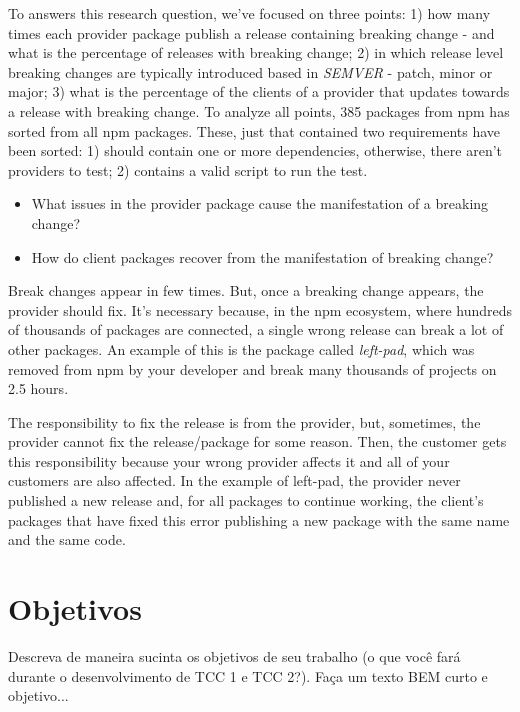 To answers this research question, we’ve focused on three points: 1) how many times each provider package publish a release containing breaking change - and what is the percentage of releases with breaking change; 2) in which release level breaking changes are typically introduced based in \textit{SEMVER} - patch, minor or major; 3) what is the percentage of the clients of a provider that updates towards a release with breaking change. To analyze all points, 385 packages from npm has sorted from all npm packages. These, just that contained two requirements have been sorted: 1) should contain one or more dependencies, otherwise, there aren’t providers to test; 2) contains a valid script to run the test.

\begin{itemize}
    \item What issues in the provider package cause the manifestation of a breaking change?
\end{itemize}

\begin{itemize}
    \item How do client packages recover from the manifestation of breaking change?
\end{itemize}

Break changes appear in few times. But, once a breaking change appears, the provider should fix. It’s necessary because, in the npm ecosystem, where hundreds of thousands of packages are connected, a single wrong release can break a lot of other packages. An example of this is the package called \textit{left-pad}, which was removed from npm by your developer and break many thousands of projects on 2.5 hours.

The responsibility to fix the release is from the provider, but, sometimes, the provider cannot fix the release/package for some reason. Then, the customer gets this responsibility because your wrong provider affects it and all of your customers are also affected. In the example of left-pad, the provider never published a new release and, for all packages to continue working, the client's packages that have fixed this error publishing a new package with the same name and the same code.
\section{Objetivos}
\label{cap:introducao:sec:objetivos}

Descreva de maneira sucinta os objetivos de seu trabalho (o que você fará durante o desenvolvimento de TCC 1 e TCC 2?). Faça um texto BEM curto e objetivo...

